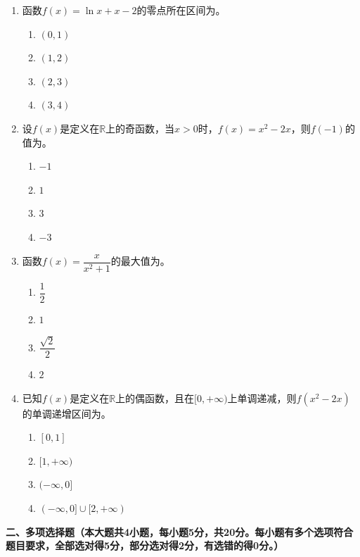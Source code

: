 \documentclass[12pt, a4paper]{ctexart}
\newcommand{\blank}[1]{\underline{\hspace{#1}}}
\begin{document}
\begin{enumerate}
\item 函数$f(x)=\ln x+x-2$的零点所在区间为\blank{3cm}。
\begin{enumerate}[label=\Alph*.]
\item $(0,1)$
\item $(1,2)$
\item $(2,3)$
\item $(3,4)$
\end{enumerate}

\item 设$f(x)$是定义在$\mathbb{R}$上的奇函数，当$x>0$时，$f(x)=x^2-2x$，则$f(-1)$的值为\blank{3cm}。
\begin{enumerate}[label=\Alph*.]
\item $-1$
\item $1$
\item $3$
\item $-3$
\end{enumerate}

\item 函数$f(x)=\dfrac{x}{x^2+1}$的最大值为\blank{3cm}。
\begin{enumerate}[label=\Alph*.]
\item $\dfrac{1}{2}$
\item $1$
\item $\dfrac{\sqrt{2}}{2}$
\item $2$
\end{enumerate}

\item 已知$f(x)$是定义在$\mathbb{R}$上的偶函数，且在$[0,+\infty)$上单调递减，则$f(x^2-2x)$的单调递增区间为\blank{3cm}。
\begin{enumerate}[label=\Alph*.]
\item $[0,1]$
\item $[1,+\infty)$
\item $(-\infty,0]$
\item $(-\infty,0]\cup[2,+\infty)$
\end{enumerate}
\end{enumerate}

\vspace{1em}

\noindent\textbf{二、多项选择题（本大题共4小题，每小题5分，共20分。每小题有多个选项符合题目要求，全部选对得5分，部分选对得2分，有选错的得0分。）}
\end{document}
